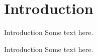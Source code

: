 \section{Introduction}

\begin{frame}{Introduction}
    Some text here. 
\end{frame}

\begin{frame}{Introduction}
    Some text here.
\end{frame}